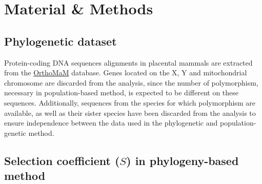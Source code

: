 \documentclass{article}
\newcommand{\Sphy}{S}
\begin{document}
    \section{Material \& Methods}
    \label{sec:methods}

    \subsection{Phylogenetic dataset}

    Protein-coding DNA sequences alignments in placental mammals are extracted from the \href{https://www.orthomam.univ-montp2.fr}{OrthoMaM} database\cite{ranwez_orthomam_2007, douzery_orthomam_2014, scornavacca_orthomam_2019}.
    Genes located on the X, Y and mitochondrial chromosome are discarded from the analysis, since the number of polymorphism, necessary in population-based method, is expected to be different on these sequences.
    Additionally, sequences from the species for which polymorphism are available, as well as their sister species have been discarded from the analysis to ensure independence between the data used in the phylogenetic and population-genetic method.

    \subsection{Selection coefficient ($\Sphy$) in phylogeny-based method}
    \label{subsec:s-phylogeny-method}
\end{document}
